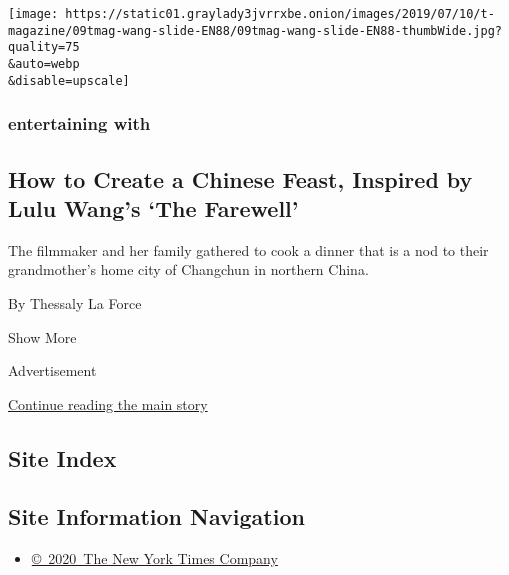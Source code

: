 \begin{enumerate}
  \texttt{[image: https://static01.graylady3jvrrxbe.onion/images/2019/07/10/t-magazine/09tmag-wang-slide-EN88/09tmag-wang-slide-EN88-thumbWide.jpg?quality=75\\\&auto=webp\\\&disable=upscale]}

  \hypertarget{entertaining-with-1}{%
  \subsubsection{entertaining with}\label{entertaining-with-1}}

  \hypertarget{how-to-create-a-chinese-feast-inspired-by-lulu-wangs-the-farewell}{%
  \subsection{How to Create a Chinese Feast, Inspired by Lulu Wang's
  `The
  Farewell'}\label{how-to-create-a-chinese-feast-inspired-by-lulu-wangs-the-farewell}}

  The filmmaker and her family gathered to cook a dinner that is a nod
  to their grandmother's home city of Changchun in northern China.

  By Thessaly La Force
\end{enumerate}

Show More

Advertisement

\protect\hyperlink{after-mid2}{Continue reading the main story}

\hypertarget{site-index}{%
\subsection{Site Index}\label{site-index}}

\hypertarget{site-information-navigation}{%
\subsection{Site Information
Navigation}\label{site-information-navigation}}

\begin{itemize}
\tightlist
\item
  \href{https://help.nytimes3xbfgragh.onion/hc/en-us/articles/115014792127-Copyright-notice}{©~2020~The
  New York Times Company}
\end{itemize}

